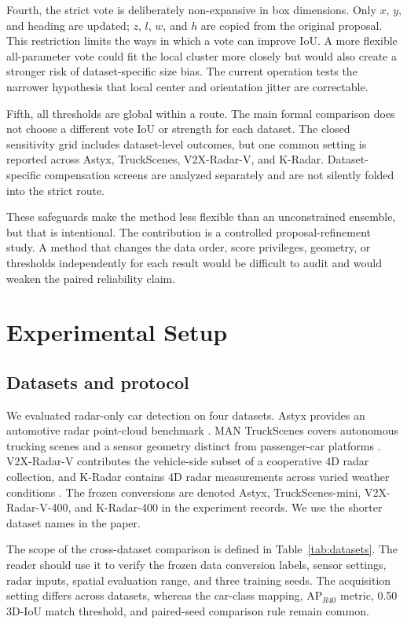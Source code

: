 \documentclass[preprint,12pt,times]{elsarticle}
\newcommand{\tabref}[1]{\textcolor{floatreviewblue}{Table~\ref{#1}}}
\newcommand{\tabref}[1]{Table~\ref{#1}}
\begin{document}
Fourth, the strict vote is deliberately non-expansive in box dimensions.
Only $x$, $y$, and heading are updated; $z$, $l$, $w$, and $h$ are copied from
the original proposal. This restriction limits the ways in which a vote can
improve IoU. A more flexible all-parameter vote could fit the local cluster
more closely but would also create a stronger risk of dataset-specific size
bias. The current operation tests the narrower hypothesis that local center
and orientation jitter are correctable.

Fifth, all thresholds are global within a route. The main formal comparison
does not choose a different vote IoU or strength for each dataset. The closed
sensitivity grid includes dataset-level outcomes, but one common setting is
reported across Astyx, TruckScenes, V2X-Radar-V, and K-Radar. Dataset-specific
compensation screens are analyzed separately and are not silently folded into
the strict route.

These safeguards make the method less flexible than an unconstrained ensemble,
but that is intentional. The contribution is a controlled proposal-refinement
study. A method that changes the data order, score privileges, geometry, or
thresholds independently for each result would be difficult to audit and
would weaken the paired reliability claim.

\section{Experimental Setup}

\subsection{Datasets and protocol}

We evaluated radar-only car detection on four datasets. Astyx provides an
automotive radar point-cloud benchmark \cite{meyer2019astyx}. MAN TruckScenes
covers autonomous trucking scenes and a sensor geometry distinct from
passenger-car platforms \cite{fent2024truckscenes}.
V2X-Radar-V contributes the vehicle-side subset of a cooperative 4D radar
collection, and K-Radar contains 4D radar measurements across varied weather
conditions \cite{paek2022kradar,yang2024v2xradar}. The frozen conversions are
denoted Astyx, TruckScenes-mini, V2X-Radar-V-400, and K-Radar-400 in the
experiment records. We use the shorter dataset names in the paper.

The scope of the cross-dataset comparison is defined in
\tabref{tab:datasets}. The reader should use it to verify the frozen data
conversion labels, sensor settings, radar inputs, spatial evaluation range,
and three training seeds. The acquisition setting differs across datasets,
whereas the car-class mapping, AP$_{R40}$ metric, 0.50 3D-IoU match threshold,
and paired-seed comparison rule remain common.
\end{document}

